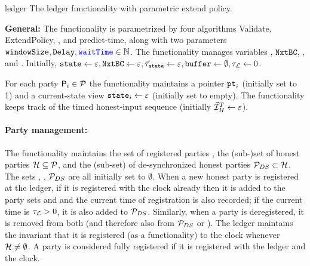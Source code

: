 \begin{cccFunctionality}
	{\funcFairLedger}
	{ledger}
	{The ledger functionality with parametric extend policy.}

	\textbf{General:}
	The functionality is parametrized by four algorithms \textsf{Validate}, \textsf{ExtendPolicy}, \blockify, and \textsf{predict-time}, along with two parameters $\mathtt{windowSize}, \mathtt{Delay}, {\color{blue}\mathtt{waitTime}} \in \mathbb{N}$.
	The functionality manages variables \state, $\mathtt{NxtBC}$, \buffer, \ledgerTime and \timedState.
	Initially, $\mathtt{state} \gets \varepsilon, \mathtt{NxtBC} \gets \varepsilon, \vec{\tau}_{\mathtt{state}} \gets \varepsilon, \mathtt{buffer} \gets \emptyset, \tau_\mathcal{L} \gets 0$.

	For each party $\mathsf{P}_i \in \mathcal{P}$ the functionality maintains a pointer $\mathtt{pt}_i$ (initially set to 1) and a current-state view $\mathtt{state}_i \gets \varepsilon$ (initially set to empty).
	The functionality keeps track of the timed honest-input sequence \honestInputSeq (initially $\vec{\mathcal{I}}^T_H \gets \varepsilon$).

	\paragraph{Party management:}
	The functionality maintains the set of registered parties \partyset, the (sub-)set of honest parties $\mathcal{H} \subseteq \mathcal{P}$, and the (sub-set) of de-synchronized honest parties $\mathcal{P}_{DS} \subset \mathcal{H}$.
	The sets \partyset, \honestPartySet, $\mathcal{P}_{DS}$ are all initially set to $\emptyset$.
	When a new honest party is registered at the ledger, if it is registered with the clock already then it is added to the party sets \honestPartySet and \partyset and the current time of registration is also recorded; if the current time is $\tau_\mathcal{L} > 0$, it is also added to $\mathcal{P}_{DS}$.
	Similarly, when a party is deregistered, it is removed from both \partyset (and therefore also from $\mathcal{P}_{DS}$ or \honestPartySet).
	The ledger maintains the invariant that it is registered (as a functionality) to the clock whenever $\mathcal{H} \neq \emptyset$.
	A party is considered fully registered if it is registered with the ledger and the clock.


\end{cccFunctionality}
